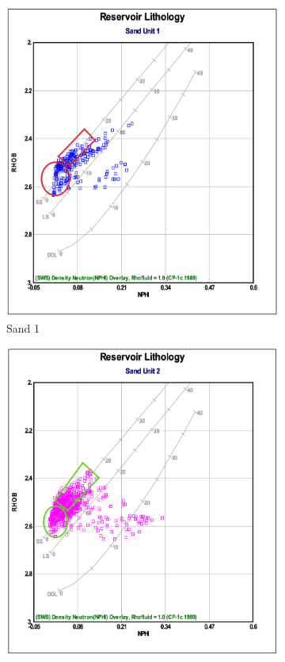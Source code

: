 \documentclass{gji}
\begin{document}
\begin{figure}
\centering
\begin{subfigure}{0.4\textwidth}
    \includegraphics[width=\textwidth]{SS1} %
    \caption{Sand 1}
    \label{fig:sand1}
\end{subfigure}
\hfill
\begin{subfigure}{0.4\textwidth}
    \includegraphics[width=\textwidth]{SS2}

\end{subfigure}
\end{figure}
\end{document}
